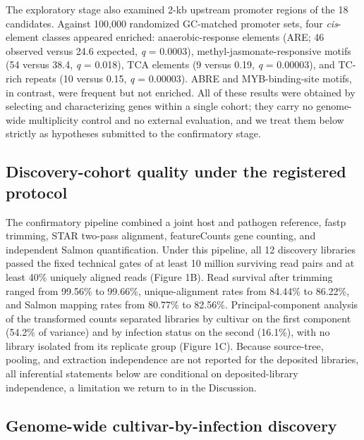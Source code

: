 \documentclass[12pt,letterpaper]{article}
\begin{document}
The exploratory stage also examined 2-kb upstream promoter regions of the 18 candidates. Against 100,000 randomized GC-matched promoter sets, four \textit{cis}-element classes appeared enriched: anaerobic-response elements (ARE; 46 observed versus 24.6 expected, \textit{q} = 0.0003), methyl-jasmonate-responsive motifs (54 versus 38.4, \textit{q} = 0.018), TCA elements (9 versus 0.19, \textit{q} = 0.00003), and TC-rich repeats (10 versus 0.15, \textit{q} = 0.00003). ABRE and MYB-binding-site motifs, in contrast, were frequent but not enriched. All of these results were obtained by selecting and characterizing genes within a single cohort; they carry no genome-wide multiplicity control and no external evaluation, and we treat them below strictly as hypotheses submitted to the confirmatory stage.

\subsection*{Discovery-cohort quality under the registered protocol}

The confirmatory pipeline combined a joint host and pathogen reference, fastp trimming, STAR two-pass alignment, featureCounts gene counting, and independent Salmon quantification. Under this pipeline, all 12 discovery libraries passed the fixed technical gates of at least 10 million surviving read pairs and at least 40\% uniquely aligned reads (Figure 1B). Read survival after trimming ranged from 99.56\% to 99.66\%, unique-alignment rates from 84.44\% to 86.22\%, and Salmon mapping rates from 80.77\% to 82.56\%. Principal-component analysis of the transformed counts separated libraries by cultivar on the first component (54.2\% of variance) and by infection status on the second (16.1\%), with no library isolated from its replicate group (Figure 1C). Because source-tree, pooling, and extraction independence are not reported for the deposited libraries, all inferential statements below are conditional on deposited-library independence, a limitation we return to in the Discussion.

\subsection*{Genome-wide cultivar-by-infection discovery}
\end{document}
